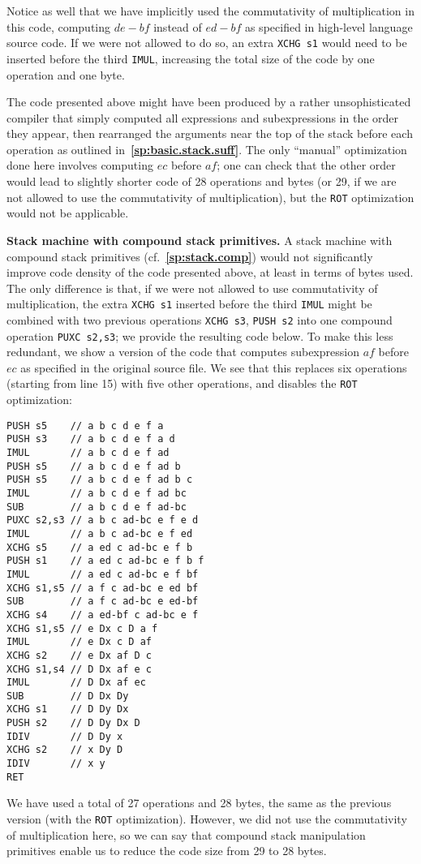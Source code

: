 \documentclass[12pt,oneside]{article}
\def\makepoint#1{\medbreak\noindent{\bf #1.\ }}
\def\nxsubpoint{\refstepcounter{subsubsection}%
  \smallbreak\makepoint{\thesubsubsection}}
\def\refpoint#1{{\rm\textbf{\ref{#1}}}}
\let\ptref=\refpoint
\def\emb#1{\textbf{#1.}}
\begin{document}
Notice as well that we have implicitly used the commutativity of multiplication in this code, computing $de-bf$ instead of $ed-bf$ as specified in high-level language source code. If we were not allowed to do so, an extra \texttt{XCHG s1} would need to be inserted before the third \texttt{IMUL}, increasing the total size of the code by one operation and one byte.

The code presented above might have been produced by a rather unsophisticated compiler that simply computed all expressions and subexpressions in the order they appear, then rearranged the arguments near the top of the stack before each operation as outlined in~\ptref{sp:basic.stack.suff}. The only ``manual'' optimization done here involves computing $ec$ before $af$; one can check that the other order would lead to slightly shorter code of 28 operations and bytes (or 29, if we are not allowed to use the commutativity of multiplication), but the \texttt{ROT} optimization would not be applicable.

\nxsubpoint\emb{Stack machine with compound stack primitives}
A stack machine with compound stack primitives (cf.~\ptref{sp:stack.comp}) would not significantly improve code density of the code presented above, at least in terms of bytes used. The only difference is that, if we were not allowed to use commutativity of multiplication, the extra \texttt{XCHG s1} inserted before the third \texttt{IMUL} might be combined with two previous operations \texttt{XCHG s3}, \texttt{PUSH s2} into one compound operation \texttt{PUXC s2,s3}; we provide the resulting code below. To make this less redundant, we show a version of the code that computes subexpression $af$ before $ec$ as specified in the original source file. We see that this replaces six operations (starting from line 15) with five other operations, and disables the \texttt{ROT} optimization:
\begin{verbatim}
PUSH s5    // a b c d e f a
PUSH s3    // a b c d e f a d
IMUL       // a b c d e f ad
PUSH s5    // a b c d e f ad b
PUSH s5    // a b c d e f ad b c
IMUL       // a b c d e f ad bc
SUB        // a b c d e f ad-bc
PUXC s2,s3 // a b c ad-bc e f e d
IMUL       // a b c ad-bc e f ed
XCHG s5    // a ed c ad-bc e f b
PUSH s1    // a ed c ad-bc e f b f
IMUL       // a ed c ad-bc e f bf
XCHG s1,s5 // a f c ad-bc e ed bf
SUB        // a f c ad-bc e ed-bf
XCHG s4    // a ed-bf c ad-bc e f
XCHG s1,s5 // e Dx c D a f
IMUL       // e Dx c D af
XCHG s2    // e Dx af D c
XCHG s1,s4 // D Dx af e c
IMUL       // D Dx af ec
SUB        // D Dx Dy
XCHG s1    // D Dy Dx
PUSH s2    // D Dy Dx D
IDIV       // D Dy x
XCHG s2    // x Dy D
IDIV       // x y
RET
\end{verbatim}
We have used a total of 27 operations and 28 bytes, the same as the previous version (with the \texttt{ROT} optimization). However, we did not use the commutativity of multiplication here, so we can say that compound stack manipulation primitives enable us to reduce the code size from 29 to 28 bytes.
\end{document}
